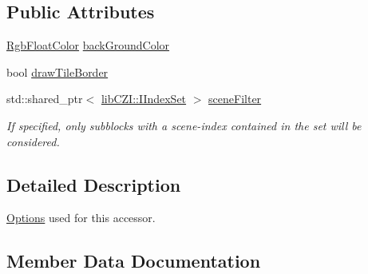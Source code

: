 \subsection*{Public Attributes}
\begin{DoxyCompactItemize}
\item 
\hyperlink{structlib_c_z_i_1_1_rgb_float_color}{Rgb\+Float\+Color} \hyperlink{structlib_c_z_i_1_1_i_single_channel_pyramid_layer_tile_accessor_1_1_options_a6d5fe02340cf9e640b0c7a4e994e4c3a}{back\+Ground\+Color}
\item 
bool \hyperlink{structlib_c_z_i_1_1_i_single_channel_pyramid_layer_tile_accessor_1_1_options_a53cf2b7a087395332e1daae3a3318b08}{draw\+Tile\+Border}
\item 
\mbox{\label{structlib_c_z_i_1_1_i_single_channel_pyramid_layer_tile_accessor_1_1_options_ac0a487d11790cfaaf5e0ea052efd178f}} 
std\+::shared\+\_\+ptr$<$ \hyperlink{classlib_c_z_i_1_1_i_index_set}{lib\+C\+Z\+I\+::\+I\+Index\+Set} $>$ \hyperlink{structlib_c_z_i_1_1_i_single_channel_pyramid_layer_tile_accessor_1_1_options_ac0a487d11790cfaaf5e0ea052efd178f}{scene\+Filter}
\begin{DoxyCompactList}\small\item\em If specified, only subblocks with a scene-\/index contained in the set will be considered. \end{DoxyCompactList}\end{DoxyCompactItemize}


\subsection{Detailed Description}
\hyperlink{structlib_c_z_i_1_1_i_single_channel_pyramid_layer_tile_accessor_1_1_options}{Options} used for this accessor. 

\subsection{Member Data Documentation}
\mbox{\label{structlib_c_z_i_1_1_i_single_channel_pyramid_layer_tile_accessor_1_1_options_a6d5fe02340cf9e640b0c7a4e994e4c3a}} 
